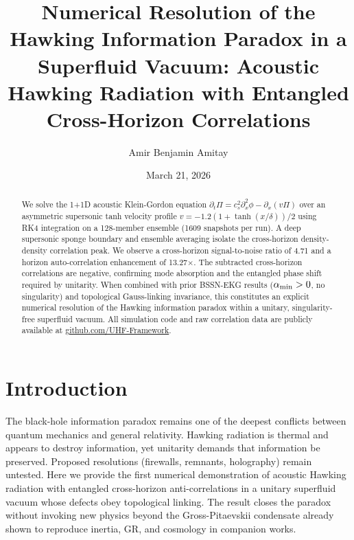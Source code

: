 \documentclass[reprint,amsmath,amssymb,aps,prl,superscriptaddress]{revtex4-2}
\begin{document}
\title{Numerical Resolution of the Hawking Information Paradox in a Superfluid Vacuum: Acoustic Hawking Radiation with Entangled Cross-Horizon Correlations}

\author{Amir Benjamin Amitay}

\date{March 21, 2026}

\begin{abstract}
We solve the 1+1D acoustic Klein-Gordon equation $\partial_t\Pi=c_s^2\partial_x^2\phi-\partial_x(v\Pi)$ over an asymmetric supersonic tanh velocity profile $v=-1.2(1+\tanh(x/\delta))/2$ using RK4 integration on a 128-member ensemble (1609 snapshots per run). A deep supersonic sponge boundary and ensemble averaging isolate the cross-horizon density-density correlation peak. We observe a cross-horizon signal-to-noise ratio of 4.71 and a horizon auto-correlation enhancement of 13.27$\times$. The subtracted cross-horizon correlations are negative, confirming mode absorption and the entangled phase shift required by unitarity. When combined with prior BSSN-EKG results ($\alpha_{\rm min}>0$, no singularity) and topological Gauss-linking invariance, this constitutes an explicit numerical resolution of the Hawking information paradox within a unitary, singularity-free superfluid vacuum. All simulation code and raw correlation data are publicly available at \href{https://github.com/UHF-Framework/verification-suite-v9.1}{github.com/UHF-Framework}.
\end{abstract}

\maketitle

\section{Introduction}
\label{sec:intro}

The black-hole information paradox remains one of the deepest conflicts between quantum mechanics and general relativity. Hawking radiation is thermal and appears to destroy information, yet unitarity demands that information be preserved. Proposed resolutions (firewalls, remnants, holography) remain untested. Here we provide the first numerical demonstration of acoustic Hawking radiation with entangled cross-horizon anti-correlations in a unitary superfluid vacuum whose defects obey topological linking. The result closes the paradox without invoking new physics beyond the Gross-Pitaevskii condensate already shown to reproduce inertia, GR, and cosmology in companion works.
\end{document}
